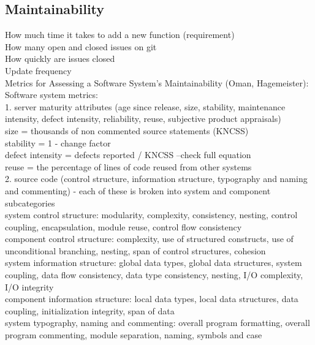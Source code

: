 \documentclass{article}
\begin{document}
\subsection{Maintainability}
How much time it takes to add a new function (requirement)\\
How many open and closed issues on git\\
How quickly are issues closed\\
Update frequency\\ 

Metrics for Assessing a Software System's Maintainability (Oman, Hagemeister):\\
Software system metrics:\\
1. server maturity attributes (age since release, size, stability, maintenance intensity, defect intensity, reliability, reuse, subjective product appraisals)\\
size = thousands of non commented source statements (KNCSS)\\
stability = 1 - change factor\\
defect intensity = defects reported / KNCSS --check full equation\\
reuse = the percentage of lines of code reused from other systems\\


2. source code (control structure, information structure, typography and naming and commenting) - each of these is broken into system and component subcategories\\

system control structure: modularity, complexity, consistency, nesting, control coupling, encapsulation, module reuse, control flow consistency\\

component control structure: complexity, use of structured constructs, use of unconditional branching, nesting, span of control structures, cohesion\\

system information structure: global data types, global data structures, system coupling, data flow consistency, data type consistency, nesting, I/O complexity, I/O integrity\\

component information structure: local data types, local data structures, data coupling, initialization integrity, span of data \\

system typography, naming and commenting: overall program formatting, overall program commenting, module separation, naming, symbols and case\\
\end{document}
